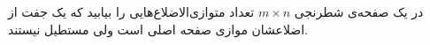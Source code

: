 \EXERCISE
در یک صفحه‌ی شطرنجی
$m \times n$
تعداد متوازی‌الاضلاع‌هایی را بیابید که یک جفت از اضلاعشان موازی صفحه اصلی است ولی مستطیل نیستند.